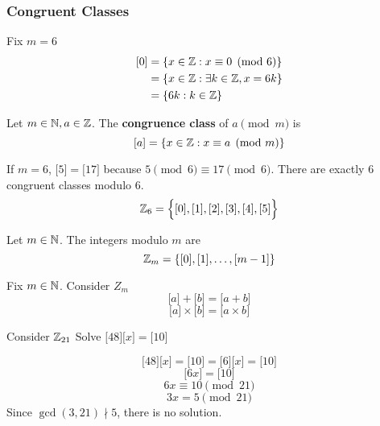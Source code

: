 \documentclass[english, 12pt]{article}
\begin{document}
\subsubsection*{Congruent Classes}
Fix $m=6$
\begin{align*}
\lbrack 0 \rbrack &=\{x \in {\mathbb{Z}} : x \equiv 0 \pmod 6\}\\
&= \{x \in {\mathbb{Z}}: \exists k \in {\mathbb{Z}}, x = 6k \} \\
&= \{6k:k \in {\mathbb{Z}} \}
\end{align*}
\begin{defn}
Let $m \in {\mathbb{N}}, a \in {\mathbb{Z}}$. The \textbf{congruence class} of $a \pmod m$ is \[\lbrack a \rbrack = \{x \in {\mathbb{Z}}: x \equiv a \pmod m \}\]
\end{defn}
\begin{exmp}
If $m=6$, $\lbrack 5 \rbrack = \lbrack 17 \rbrack$ because $5 \pmod 6 \equiv 17 \pmod 6$. There are exactly $6$ congruent classes modulo $6$.
\[{\mathbb{Z}}_{6} = \Big\{\lbrack 0 \rbrack,\lbrack 1 \rbrack,\lbrack 2 \rbrack,\lbrack 3 \rbrack,\lbrack 4 \rbrack,\lbrack 5 \rbrack\Big\} \]
\end{exmp}
\begin{defn}
Let $m \in {\mathbb{N}}$. The integers modulo $m$ are
\[{\mathbb{Z}}_{m}= \{\lbrack 0 \rbrack,\lbrack 1 \rbrack, \dots, \lbrack m-1 \rbrack\} \]
\end{defn}
\begin{defn}
Fix $m \in {\mathbb{N}}$. Consider $Z_{m}$
\[ \lbrack a \rbrack + \lbrack b \rbrack = \lbrack a + b \rbrack \]
\[ \lbrack a \rbrack \times \lbrack b \rbrack = \lbrack a \times b \rbrack\]
\end{defn}
\begin{exercise}
Consider ${\mathbb{Z}}_{21}$ Solve $\lbrack 48\rbrack\lbrack x \rbrack = \lbrack 10 \rbrack$
\begin{sol}
\[\lbrack 48\rbrack\lbrack x \rbrack = \lbrack 10 \rbrack =  \lbrack 6 \rbrack\lbrack x \rbrack = \lbrack 10 \rbrack \]
\[\lbrack 6x \rbrack = \lbrack 10 \rbrack \]
\[ 6x \equiv 10 \pmod{21} \]
\[ 3x = 5 \pmod{21} \]
Since $\gcd(3,21) \nmid 5$, there is no solution.
\end{sol}
\end{exercise}
\end{document}
